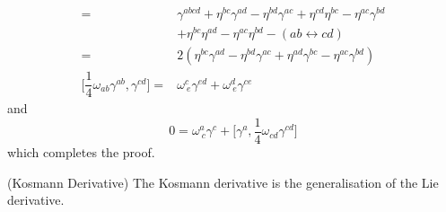 \begin{recall}
\begin{align*}
=&\gamma ^{abc d}+\eta ^{bc}\gamma ^{ad}-\eta ^{bd}\gamma ^{ac}+\eta ^{c d}\eta ^{bc}-\eta ^{ac}\gamma ^{bd}\\
&+\eta ^{bc}\eta ^{ad}-\eta ^{ac}\eta ^{bd}-(ab\leftrightarrow c d)\\
=&2(\eta ^{bc}\gamma ^{ad}-\eta ^{bd}\gamma ^{ac}+\eta ^{ad}\gamma ^{bc}-\eta ^{ac}\gamma ^{bd})\\
\Big[\dfrac{1}{4}\omega _{ab}\gamma ^{ab},\gamma ^{cd}\Big]=&\omega ^{c}_{\ e}\gamma ^{ed}+\omega ^{d}_{\ e}\gamma ^{ce}
\end{align*}
and
\[0=\omega ^{a}_{\ c}\gamma ^{c}+\Big[\gamma ^{a},\dfrac{1}{4}\omega _{c d}\gamma ^{cd}\Big]\]
which completes the proof.
\end{recall}
\vspace{2ex}
\begin{defi}
(Kosmann Derivative) The Kosmann derivative is the generalisation of the Lie derivative. 
\end{defi}
\vspace{2ex}

 
